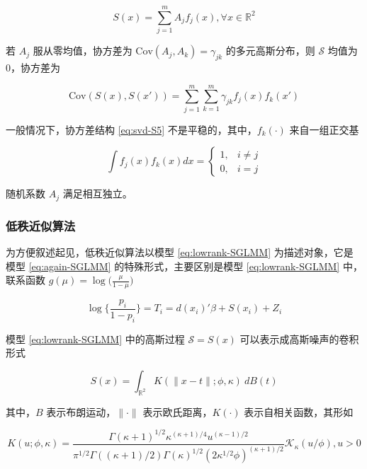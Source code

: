\documentclass[12pt,a4paper,UTF8,twoside]{book}
\theoremstyle{definition}
\theoremstyle{definition}
\theoremstyle{definition}
\theoremstyle{remark}
\begin{document}
\begin{equation}
S(x) = \sum_{j=1}^{m}A_{j}f_{j}(x), \forall x \in \mathbb{R}^2 \label{eq:svd-S4}
\end{equation}

\noindent 若 \(A_j\) 服从零均值，协方差为
\(\mathrm{Cov}(A_{j},A_{k})=\gamma_{jk}\) 的多元高斯分布，则
\(\mathcal{S}\) 均值为0，协方差为

\begin{equation}
\mathrm{Cov}(S(x),S(x')) =  \sum_{j=1}^{m}\sum_{k=1}^{m}\gamma_{jk}f_{j}(x)f_{k}(x') \label{eq:svd-S5}
\end{equation}

\noindent 一般情况下，协方差结构 \eqref{eq:svd-S5}
不是平稳的，其中，\(f_{k}(\cdot)\) 来自一组正交基

\begin{equation*}
\int f_{j}(x)f_{k}(x)dx = 
\begin{cases}
1, & i \neq j \\
0, & i = j
\end{cases}
\end{equation*}

\noindent  随机系数 \(A_{j}\) 满足相互独立。

\subsubsection{低秩近似算法}

为方便叙述起见，低秩近似算法以模型 \eqref{eq:lowrank-SGLMM}
为描述对象，它是模型 \eqref{eq:again-SGLMM} 的特殊形式，主要区别是模型
\eqref{eq:lowrank-SGLMM} 中，联系函数
\(g(\mu) = \log\big(\frac{\mu}{1-\mu}\big)\)

\begin{equation}
\log\{\frac{p_i}{1-p_i}\}  = T_{i} = d(x_i)'\beta + S(x_i) + Z_{i} \label{eq:lowrank-SGLMM}
\end{equation}

\noindent 模型 \eqref{eq:lowrank-SGLMM} 中的高斯过程
\(\mathcal{S} = S(x)\) 可以表示成高斯噪声的卷积形式

\begin{equation}
S(x) = \int_{\mathbb{R}^2} K(\|x-t\|; \phi, \kappa) \: d B(t) \label{eq:convolution}
\end{equation}

\noindent 其中，\(B\) 表示布朗运动，\(\|\cdot\|\)
表示欧氏距离，\(K(\cdot)\) 表示自相关函数，其形如

\begin{equation}
K(u; \phi, \kappa) = \frac{\Gamma(\kappa + 1)^{1/2}\kappa^{(\kappa+1)/4}u^{(\kappa-1)/2}}{\pi^{1/2}\Gamma((\kappa+1)/2)\Gamma(\kappa)^{1/2}(2\kappa^{1/2}\phi)^{(\kappa+1)/2}}\mathcal{K}_{\kappa}(u/\phi), u > 0 \label{eq:matern-kernel}
\end{equation}
\end{document}

